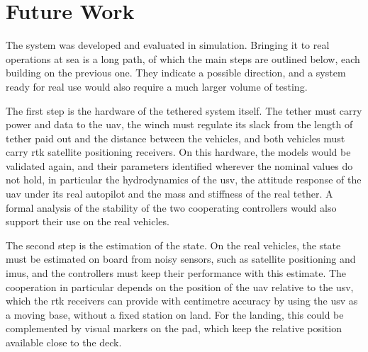 
\section{Future Work}
\label{sec:concl_future}

The system was developed and evaluated in simulation. Bringing it to real operations at sea is a long path, of which the main steps are outlined below, each building on the previous one. They indicate a possible direction, and a system ready for real use would also require a much larger volume of testing.

The first step is the hardware of the tethered system itself. The tether must carry power and data to the \gls{uav}, the winch must regulate its slack from the length of tether paid out and the distance between the vehicles, and both vehicles must carry \gls{rtk} satellite positioning receivers. On this hardware, the models would be validated again, and their parameters identified wherever the nominal values do not hold, in particular the hydrodynamics of the \gls{usv}, the attitude response of the \gls{uav} under its real autopilot and the mass and stiffness of the real tether. A formal analysis of the stability of the two cooperating controllers would also support their use on the real vehicles.

The second step is the estimation of the state. On the real vehicles, the state must be estimated on board from noisy sensors, such as satellite positioning and \glspl{imu}, and the controllers must keep their performance with this estimate. The cooperation in particular depends on the position of the \gls{uav} relative to the \gls{usv}, which the \gls{rtk} receivers can provide with centimetre accuracy by using the \gls{usv} as a moving base, without a fixed station on land. For the landing, this could be complemented by visual markers on the pad, which keep the relative position available close to the deck.

